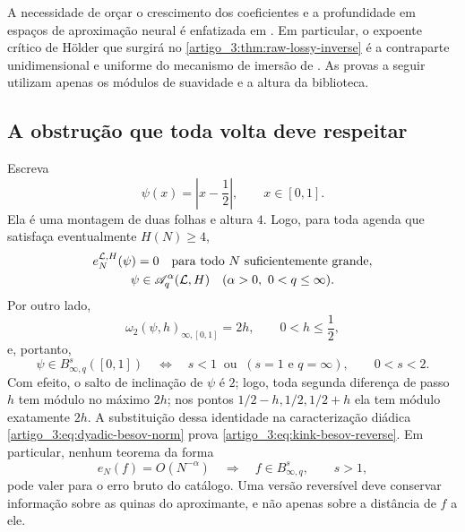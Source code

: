 A necessidade de orçar o crescimento dos coeficientes e a profundidade em
espaços de aproximação neural é enfatizada em
\citet{artigo_2-gribonval2022,artigo_2-grohs2023,artigo_1-guhring2021}. Em particular, o expoente crítico de Hölder
que surgirá no \cref{artigo_3:thm:raw-lossy-inverse} é a contraparte unidimensional e
uniforme do mecanismo de imersão de \citet{artigo_2-grohs2023}. As provas a seguir utilizam
apenas os módulos de suavidade e a altura da biblioteca.

\subsection{A obstrução que toda volta deve respeitar}

Escreva
\begin{equation}
 \psi(x)=\left|x-\frac12\right|,
 \qquad x\in[0,1].
 \label{artigo_3:eq:reverse-kink}
\end{equation}
Ela é uma montagem de duas folhas e altura $4$. Logo, para toda agenda que
satisfaça eventualmente $H(N)\ge4$,
\begin{equation}
 \begin{gathered}
 e_N^{\mathcal{L},H}(\psi)=0
 \quad\text{para todo $N$ suficientemente grande},\\
 \psi\in\mathscr A_q^\alpha(\mathcal{L},H)
 \quad(\alpha>0,\ 0<q\le\infty).
 \end{gathered}
 \label{artigo_3:eq:kink-zero-raw-error}
\end{equation}
Por outro lado,
\begin{equation}
 \omega_2(\psi,h)_{\infty,[0,1]}=2h,
 \qquad 0<h\le\frac12,
 \label{artigo_3:eq:kink-exact-modulus-reverse}
\end{equation}
e, portanto,
\begin{equation}
 \psi\in B^s_{\infty,q}([0,1])
 \quad\Longleftrightarrow\quad
 s<1\ \text{ ou }\ (s=1\text{ e }q=\infty),
 \qquad 0<s<2.
 \label{artigo_3:eq:kink-besov-reverse}
\end{equation}
Com efeito, o salto de inclinação de $\psi$ é $2$; logo, toda segunda diferença
de passo $h$ tem módulo no máximo $2h$; nos pontos
$1/2-h,1/2,1/2+h$ ela tem módulo exatamente $2h$. A substituição dessa identidade
na caracterização diádica \eqref{artigo_3:eq:dyadic-besov-norm} prova
\eqref{artigo_3:eq:kink-besov-reverse}. Em particular, nenhum
teorema da forma
\begin{equation}
 e_N(f)=O(N^{-\alpha})\quad\Longrightarrow\quad
 f\in B^s_{\infty,q},
 \qquad s>1,
 \label{artigo_3:eq:forbidden-unregularized-converse}
\end{equation}
pode valer para o erro bruto do catálogo. Uma versão reversível deve conservar
informação sobre as quinas do aproximante, e não apenas sobre a distância de
$f$ a ele.

